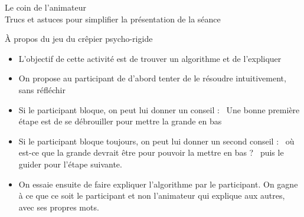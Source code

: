 \documentclass[final,hyperref={pdfpagelabels=false}]{beamer}
\renewcommand*{\large}{\fontsize{\resultlargeX}{\resultlargeY}\selectfont}
\begin{document}
\begin{frame}{Le coin de l'animateur\\[-5pt]
  {\large Trucs et astuces pour simplifier la présentation de la séance}}
  \begin{block}{À propos du jeu du crêpier psycho-rigide}
    \begin{itemize}
    \item L'objectif de cette activité est de trouver un algorithme et de
    l'expliquer
    \item On propose au participant de d'abord tenter de le résoudre
    intuitivement, sans réfléchir
    \item Si le participant bloque, on peut lui donner un conseil : \og~Une
    bonne première étape est de se débrouiller pour mettre la grande en bas~\fg
    \item Si le participant bloque toujours, on peut lui donner un second
    conseil : \og~où est-ce que la grande devrait être pour pouvoir la mettre en
    bas ? ~\fg puis le guider pour l'étape suivante.
    \item On essaie ensuite de faire expliquer l'algorithme par le participant.
    On gagne à ce que ce soit le participant et non l'animateur qui explique aux
    autres, avec ses propres mots.
    \end{itemize}
  \end{block}

\end{frame}
\end{document}
